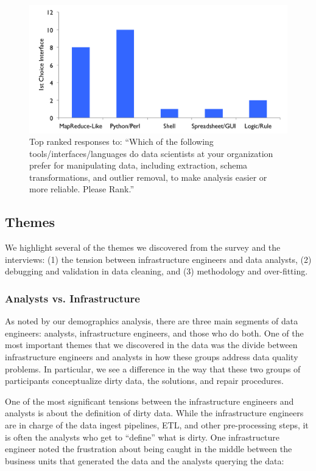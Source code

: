 \begin{figure}[t]
\centering
 \includegraphics[width=\columnwidth]{datafigs/hilda-interface.png}
 \caption{Top ranked responses to: ``Which of the following tools/interfaces/languages do data scientists at your organization prefer for manipulating data, including extraction, schema transformations, and outlier removal, to make analysis easier or more reliable. Please Rank.''\label{fig:interfaces}}
\end{figure}


\subsection{Themes}
We highlight several of the themes we discovered from the survey and the interviews: (1) the tension between infrastructure engineers and data analysts, (2) debugging and validation in data cleaning, and (3) methodology and over-fitting.

\subsubsection{Analysts vs. Infrastructure}
As noted by our demographics analysis, there are three main segments of data engineers: analysts, infrastructure engineers, and those who do both.
One of the most important themes that we discovered in the data was the divide between infrastructure engineers and analysts in how these groups address data quality problems. In particular, we see a difference in the way that these two groups of participants conceptualize dirty data, the solutions, and repair procedures.

One of the most significant tensions between the infrastructure engineers and analysts is about the definition of dirty data. While the infrastructure engineers are in charge of the data ingest pipelines, ETL, and other pre-processing steps, it is often the analysts who get to ``define'' what is dirty. One infrastructure engineer noted the frustration about being caught in the middle between the business units that generated the data and the analysts querying the data:

